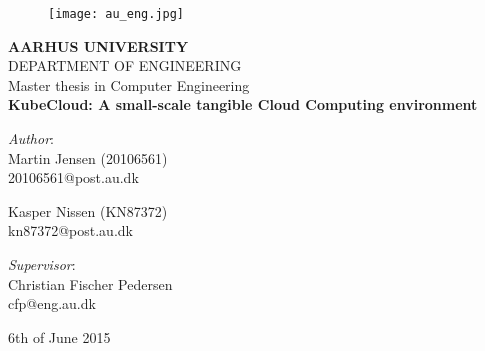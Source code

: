 \begin{titlingpage}
  \thispagestyle{empty}

\begin{adjustwidth}{-1.2cm}{0cm}
 
 \begin{figure}[t]
    \centering
    \texttt{[image: au\_eng.jpg]}
 \end{figure}    


\begin{center}
    {\bfseries AARHUS UNIVERSITY} \medskip \\
    {\large DEPARTMENT OF ENGINEERING} \vspace*{3cm} \\
    {\Large Master thesis in Computer Engineering} \vspace*{0.5cm} \\
    {\Huge \textbf{KubeCloud: A small-scale tangible Cloud Computing environment}} \vspace*{5cm}
\end{center}



\begin{minipage}[t]{0.5\textwidth}
    \begin{flushleft}
        {\large \textit{Author}:\vspace*{0.5cm} 
        \\ Martin Jensen (20106561)
        \\ 20106561@post.au.dk \vspace*{0.5cm} 

        Kasper Nissen (KN87372)
        \\ kn87372@post.au.dk
        }
    \end{flushleft}
\end{minipage}%
%
\begin{minipage}[t]{0.5\textwidth}
    \begin{flushright}
        {\large \textit{Supervisor}:\vspace*{0.5cm} \\ Christian Fischer Pedersen \\ cfp@eng.au.dk
        }
        \vspace*{0.5cm}
    \end{flushright}    
\end{minipage}%

\vspace*{5cm}

\begin{center}
\begin{minipage}[b]{0.5\textwidth}
    \vfill
    \begin{center}
        {\small 6th of June 2015}
    \end{center}    
\end{minipage}%
\end{center}    

  \end{adjustwidth}
\end{titlingpage}








